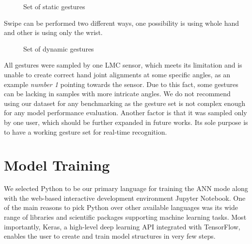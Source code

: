 \begin{enumerate}
\begin{figure}[h]
        \caption{Set of static gestures}
        \label{static_gestures}
    \end{figure}

    Swipe can be performed two different ways, one possibility is using whole hand and other is using only the wrist.

    \begin{figure}[h]
        \centering
        \qquad
        \qquad
        \qquad
        \caption{Set of dynamic gestures}
        \label{dynamic_gestures}
    \end{figure}



    
    All gestures were sampled by one LMC sensor, which meets its limitation and is unable to create correct hand joint alignments at some specific angles, as an example \textit{number 1} pointing towards the sensor. Due to this fact, some gestures can be lacking in samples with more intricate angles. We do not recommend using our dataset for any benchmarking as the gesture set is not complex enough for any model performance evaluation. Another factor is that it was sampled only by one user, which should be further expanded in future works. Its sole purpose is to have a working gesture set for real-time recognition. 

\end{enumerate}


\section{Model Training}
\label{sec:model_training}

We selected Python to be our primary language for training the ANN mode along with the web-based interactive development environment Jupyter Notebook. One of the main reasons to pick Python over other available languages was its wide range of libraries and scientific packages supporting machine learning tasks. Most importantly, Keras, a high-level deep learning API integrated with TensorFlow, enables the user to create and train model structures in very few steps.

